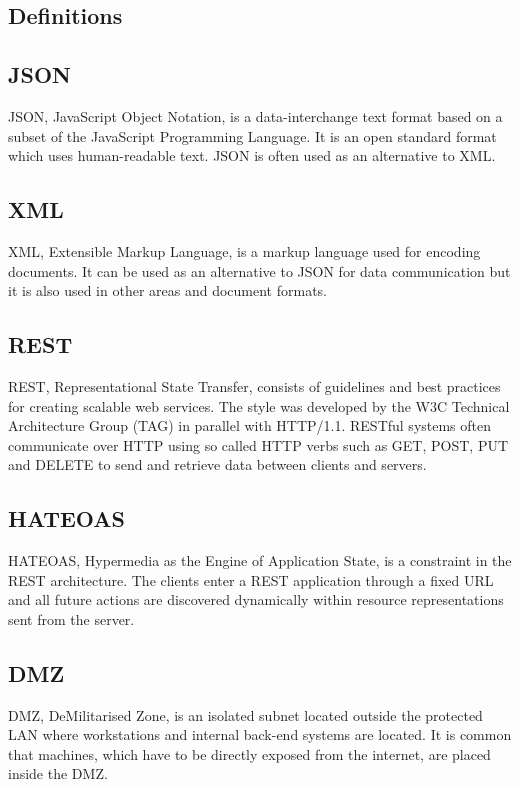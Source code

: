 \documentclass{cslthse-msc}
\begin{document}
\begin{appendices}
\chapter{Definitions}
\section{JSON}
JSON, JavaScript Object Notation, is a data-interchange text format based on a subset of the JavaScript Programming Language. It is an open standard format which uses human-readable text. JSON is often used as an alternative to XML.

\section{XML}
XML, Extensible Markup Language, is a markup language used for encoding documents. It can be used as an alternative to JSON for data communication but it is also used in other areas and document formats.

\section{REST}
REST, Representational State Transfer, consists of guidelines and best practices for creating scalable web services. The style was developed by the W3C Technical Architecture Group (TAG) in parallel with HTTP/1.1. RESTful systems often communicate over HTTP using so called HTTP verbs such as GET, POST, PUT and DELETE to send and retrieve data between clients and servers.

\section{HATEOAS}
HATEOAS, Hypermedia as the Engine of Application State, is a constraint in the REST architecture. The clients enter a REST application through a fixed URL and all future actions are discovered dynamically within resource representations sent from the server.

\section{DMZ}
DMZ, DeMilitarised  Zone, is an isolated subnet located outside the protected LAN where workstations and internal back-end systems are located. It is common that machines, which have to be directly exposed from the internet, are placed inside the DMZ.


\end{appendices}
\end{document}

